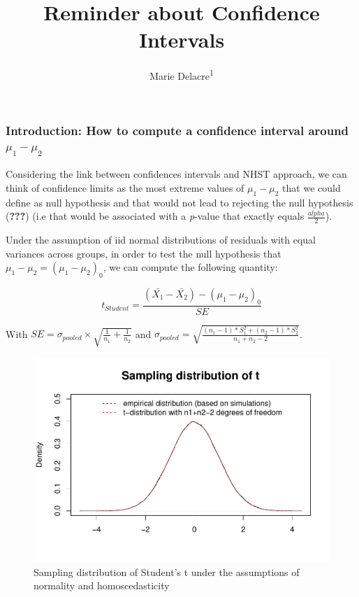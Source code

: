 \documentclass[
  man,floatsintext]{apa6}
\affiliation{
\vspace{0.5cm}
\textsuperscript{1} ULB}
\title{Reminder about Confidence Intervals}
\author{Marie Delacre\textsuperscript{1}}
\date{}
\begin{document}
\maketitle

\hypertarget{introduction-how-to-compute-a-confidence-interval-around-mu_1-mu_2}{%
\subsubsection{\texorpdfstring{Introduction: How to compute a confidence interval around \(\mu_1-\mu_2\)}{Introduction: How to compute a confidence interval around \textbackslash mu\_1-\textbackslash mu\_2}}\label{introduction-how-to-compute-a-confidence-interval-around-mu_1-mu_2}}

Considering the link between confidences intervals and NHST approach, we can think of confidence limits as the most extreme values of \(\mu_1-\mu_2\) that we could define as null hypothesis and that would not lead to rejecting the null hypothesis ({\textbf{???}}) (i.e that would be associated with a \emph{p}-value that exactly equals \(\frac{alpha}{2}\)).

Under the assumption of iid normal distributions of residuals with equal variances across groups, in order to test the null hypothesis that \(\mu_1-\mu_2= (\mu_1-\mu_2)_0\), we can compute the following quantity:

\begin{equation} 
t_{Student}=\frac{(\bar{X_1}-\bar{X_2})-(\mu_1-\mu_2)_0}{SE}
\label{eq:tstudent}
\end{equation}

With \(SE = \sigma_{pooled} \times \sqrt{\frac{1}{n_1}+\frac{1}{n_2}}\) and \(\sigma_{pooled} = \sqrt{\frac{(n_1-1)*S^2_1+(n_2-1)*S^2_2}{n_1+n_2-2}}\).

\begin{figure}
\centering
\includegraphics{Appendix2_files/figure-latex/SAMPLMEANDIFF1-1.pdf}
\caption{\label{fig:SAMPLMEANDIFF1}Sampling distribution of Student's t under the assumptions of normality and homoscedasticity}
\end{figure}
\end{document}
